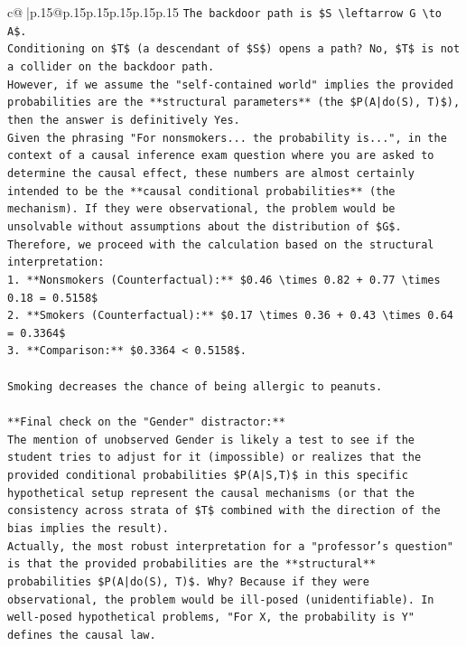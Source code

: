 \documentclass{article}
\begin{document}
{\begin{supertabular}{c@{$\;$}|p{.15\linewidth}@{}p{.15\linewidth}p{.15\linewidth}p{.15\linewidth}p{.15\linewidth}p{.15\linewidth}}
{{{\texttt{The backdoor path is \$S \textbackslash{}leftarrow G \textbackslash{}to A\$.} \\
\texttt{Conditioning on \$T\$ (a descendant of \$S\$) opens a path? No, \$T\$ is not a collider on the backdoor path.} \\
\texttt{However, if we assume the "self{-}contained world" implies the provided probabilities are the **structural parameters** (the \$P(A|do(S), T)\$), then the answer is definitively Yes.} \\
\texttt{Given the phrasing "For nonsmokers... the probability is...", in the context of a causal inference exam question where you are asked to determine the causal effect, these numbers are almost certainly intended to be the **causal conditional probabilities** (the mechanism). If they were observational, the problem would be unsolvable without assumptions about the distribution of \$G\$.} \\
\texttt{Therefore, we proceed with the calculation based on the structural interpretation:} \\
\texttt{1.  **Nonsmokers (Counterfactual):** \$0.46 \textbackslash{}times 0.82 + 0.77 \textbackslash{}times 0.18 = 0.5158\$} \\
\texttt{2.  **Smokers (Counterfactual):** \$0.17 \textbackslash{}times 0.36 + 0.43 \textbackslash{}times 0.64 = 0.3364\$} \\
\texttt{3.  **Comparison:** \$0.3364 < 0.5158\$.} \\
\\ 
\texttt{Smoking decreases the chance of being allergic to peanuts.} \\
\\ 
\texttt{**Final check on the "Gender" distractor:**} \\
\texttt{The mention of unobserved Gender is likely a test to see if the student tries to adjust for it (impossible) or realizes that the provided conditional probabilities \$P(A|S,T)\$ in this specific hypothetical setup represent the causal mechanisms (or that the consistency across strata of \$T\$ combined with the direction of the bias implies the result).} \\
\texttt{Actually, the most robust interpretation for a "professor's question" is that the provided probabilities are the **structural** probabilities \$P(A|do(S), T)\$. Why? Because if they were observational, the problem would be ill{-}posed (unidentifiable). In well{-}posed hypothetical problems, "For X, the probability is Y" defines the causal law.} \\
}}}
\end{supertabular}}
\end{document}
